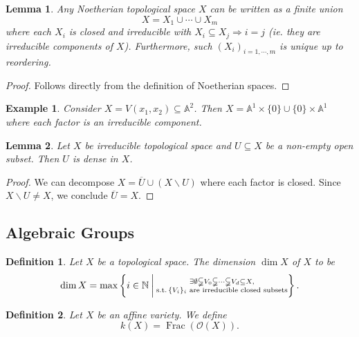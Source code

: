 \documentclass[10pt]{article}
\newtheorem{definition}{Definition}[section]
\newtheorem{lemma}{Lemma}[section]
\newtheorem{example}{Example}[section]
\numberwithin{equation}{theorem}
\DeclareMathOperator{\st}{s.t.}
\DeclareMathOperator{\Frac}{Frac}
\newcommand{\N}[0]{\mathbb{N}}
\newcommand{\A}[0]{\mathbb{A}}
\begin{document}
\begin{lemma}
Any Noetherian topological space $X$ can be written as a finite union 
\begin{equation*}
X = X_1\cup\cdots\cup X_m
\end{equation*}
where each $X_i$ is closed and irreducible with $X_i\subseteq X_j\Rightarrow i=j$ (ie. they are irreducible components of $X$). Furthermore, such $(X_i)_{i=1,\cdots,m}$ is unique up to reordering.
\end{lemma}

\begin{proof}
Follows directly from the definition of Noetherian spaces.
\end{proof}

\begin{example}
Consider $X=V(x_1,x_2)\subseteq\A^2$. Then $X=\A^1\times\{0\}\cup\{0\}\times\A^1$ where each factor is an irreducible component.
\end{example}

\begin{lemma}
Let $X$ be irreducible topological space and $U\subseteq X$ be a non-empty open subset. Then $U$ is dense in $X$.
\end{lemma}

\begin{proof}
We can decompose $X=\overline{U}\cup(X\backslash U)$ where each factor is closed. Since $X\backslash U \not = X$, we conclude $\overline{U}=X$.
\end{proof}
\subsection{Algebraic Groups}

\begin{definition}
 Let $X$ be a topological space. The dimension $\dim X$ of $X$ to be 
 \begin{equation*}
  \dim X = \max\left\{i\in\N\:\bigg{|}\: \substack{\exists \emptyset\subsetneqq V_0\subsetneqq \cdots\subsetneqq V_d\subseteq X, \\\st \text{$\{V_i\}_{i}$ are irreducible closed subsets}}\right\}.
 \end{equation*}
\end{definition}

\begin{definition}
Let $X$ be an affine variety. We define
\begin{equation*}
  k(X) = \Frac(\mathcal{O}(X)).
\end{equation*}
\end{definition}
\end{document}
